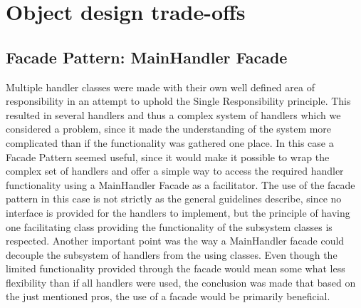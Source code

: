 \section{Object design trade-offs}
\subsection{Facade Pattern: MainHandler Facade}
Multiple handler classes were made with their own well defined area of responsibility in an attempt to uphold the Single Responsibility principle. This resulted in several handlers and thus a complex system of handlers which we considered a problem, since it made the understanding of the system more complicated than if the functionality was gathered one place.
In this case a Facade Pattern seemed useful, since it would make it possible to wrap the complex set of handlers and offer a simple way to access the required handler functionality using a MainHandler Facade as a facilitator.
The use of the facade pattern in this case is not strictly as the general guidelines describe, since no interface is provided for the handlers to implement, but the principle of having one facilitating class providing the functionality of the subsystem classes is respected.
Another important point was the way a MainHandler facade could decouple the subsystem of handlers from the using classes.
Even though the limited functionality provided through the facade would mean some what less flexibility than if all handlers were used, the conclusion was made that based on the just mentioned pros, the use of a facade would be primarily beneficial.